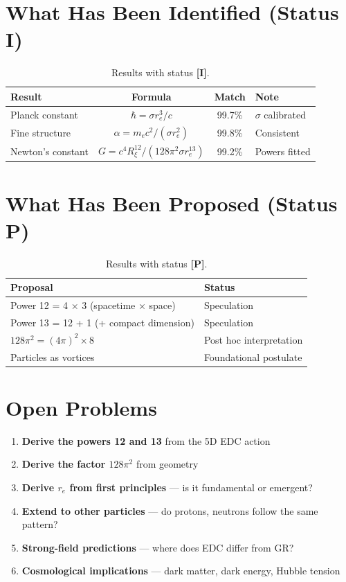 \documentclass[12pt,a4paper,openany]{book}
\theoremstyle{definition}
\theoremstyle{plain}
\theoremstyle{remark}
\newcommand{\re}{r_e}                      %
\newcommand{\Rxi}{R_\xi}                   %
\newcommand{\identified}{\textcolor{identifiedcolor}{\textbf{[I]}}}
\newcommand{\proposed}{\textcolor{proposedcolor}{\textbf{[P]}}}
\begin{document}
\section{What Has Been Identified (Status I)}

\begin{table}[H]
\centering
\begin{tabular}{|l|c|c|l|}
\hline
\textbf{Result} & \textbf{Formula} & \textbf{Match} & \textbf{Note} \\
\hline
Planck constant & $\hbar = \sigma\re^3/c$ & 99.7\% & $\sigma$ calibrated \\
Fine structure & $\alpha = m_e c^2/(\sigma\re^2)$ & 99.8\% & Consistent \\
Newton's constant & $G = c^4\Rxi^{12}/(128\pi^2\sigma\re^{13})$ & 99.2\% & Powers fitted \\
\hline
\end{tabular}
\caption{Results with status \identified{}.}
\end{table}

\section{What Has Been Proposed (Status P)}

\begin{table}[H]
\centering
\begin{tabular}{|l|l|}
\hline
\textbf{Proposal} & \textbf{Status} \\
\hline
Power 12 = 4 × 3 (spacetime × space) & Speculation \\
Power 13 = 12 + 1 (+ compact dimension) & Speculation \\
$128\pi^2 = (4\pi)^2 \times 8$ & Post hoc interpretation \\
Particles as vortices & Foundational postulate \\
\hline
\end{tabular}
\caption{Results with status \proposed{}.}
\end{table}

\section{Open Problems}

\begin{enumerate}
    \item \textbf{Derive the powers 12 and 13} from the 5D EDC action
    \item \textbf{Derive the factor $128\pi^2$} from geometry
    \item \textbf{Derive $\re$ from first principles} — is it fundamental or emergent?
    \item \textbf{Extend to other particles} — do protons, neutrons follow the same pattern?
    \item \textbf{Strong-field predictions} — where does EDC differ from GR?
    \item \textbf{Cosmological implications} — dark matter, dark energy, Hubble tension
\end{enumerate}
\end{document}
